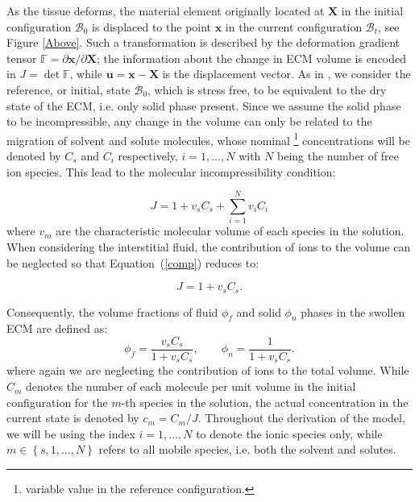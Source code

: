 \documentclass[runningheads]{llncs}
\newcommand{\F}{\ensuremath{\mathbb{F}}}
\begin{document}
As the tissue deforms, the material element originally located at $\mathbf{X}$ in the initial configuration $\mathcal{B}_0$ is displaced to the point $\mathbf{x}$ in the current configuration $\mathcal{B}_t$, see Figure \ref{Above}. Such a transformation is described by the deformation gradient tensor $\F= \partial \mathbf{x}/\partial \mathbf{X}$; the information about the change in ECM volume is encoded in $J= \det \F$, while $\mathbf{u}= \mathbf{x}-\mathbf{X}$ is the displacement vector. As in \cite{sarah}, we consider the reference, or initial, state $\mathcal{B}_0$, which is stress free, to be equivalent to the dry state of the ECM, i.e. only solid phase present. Since we assume the solid phase to be incompressible, any change in the volume can only be related to the migration of solvent and solute molecules, whose nominal \footnote{variable value in the reference configuration.} concentrations will be denoted by $C_s$ and $C_i$ respectively, $i=1,\ldots,N$ with $N$ being the number of free ion species. This lead to the molecular incompressibility condition:

\begin{equation}
 J= 1 + v_s C_s +\sum\limits_{i=1}^{N} v_i C_i
 \label{comp}
\end{equation}
where $v_m$ are the characteristic molecular volume of each species in the solution. When considering the interstitial fluid, the contribution of ions to the volume can be neglected \cite{ecm1,ecm2} so that Equation~(\ref{comp}) reduces to:

\begin{equation}
J=1+v_s C_s.
\label{inc}
\end{equation} 

Consequently, the volume fractions of fluid $\phi_f$ and solid $\phi_n$ phases in the swollen ECM are defined as:
\begin{equation}
\phi_f = \frac{v_sC_s}{1+v_sC_s}, \qquad \phi_n = \frac{1}{1+v_sC_s}.
\end{equation}
where again we are neglecting the contribution of ions to the total volume.
While $C_m$ denotes the number of each molecule per unit volume in the initial configuration for the $m$-th species in the solution, the actual concentration in the current state is denoted by $c_m=C_m/J$. Throughout the derivation of the model, we will be using the index $i=1,\ldots,N$ to denote the ionic species only, while $m\in\left\{s,1,\ldots,N\right\}$ refers to all mobile species, i.e. both the solvent and solutes.
\end{document}

